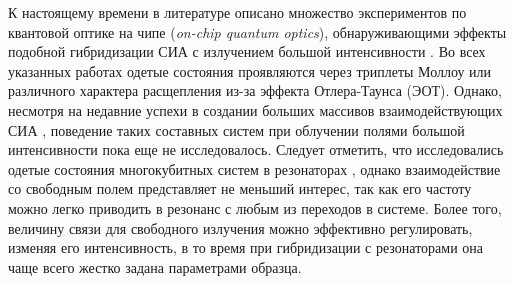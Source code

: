 \documentclass[14pt, a4paper]{extreport}
\numberwithin{equation}{section}
\begin{document}
К настоящему времени в литературе описано множество экспериментов по квантовой оптике на чипе (\foreignlanguage{english}{\textit{on-chip quantum optics}}), обнаруживающими эффекты подобной гибридизации СИА с излучением большой интенсивности \cite{baur2009measurement, sillanpaa2009autler, astafiev2010resonance, novikov2013autler, suri2013observation, koshino2013observation, braumuller2015multiphoton, peng2018vacuum, gasparinetti2019two}. Во всех указанных работах одетые состояния проявляются через триплеты Моллоу или различного характера расщепления из-за эффекта Отлера-Таунса (ЭОТ). Однако, несмотря на недавние успехи в создании больших массивов взаимодействующих СИА \cite{Song574, ye2019propagation, arute2019quantum}, поведение таких составных систем при облучении полями большой интенсивности пока еще не исследовалось. Следует отметить, что исследовались одетые состояния многокубитных систем в резонаторах \cite{fink2009dressed, macha2014implementation, shulga2017observation, yang2018probing}, однако взаимодействие со свободным полем представляет не меньший интерес, так как его частоту можно легко приводить в резонанс с любым из переходов в системе. Более того, величину связи для свободного излучения можно эффективно регулировать, изменяя его интенсивность, в то время при гибридизации с резонаторами она чаще всего жестко задана параметрами образца.
\end{document}
